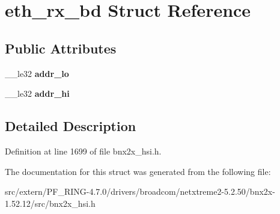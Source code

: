 \hypertarget{structeth__rx__bd}{
\section{eth\_\-rx\_\-bd Struct Reference}
\label{structeth__rx__bd}
}
\subsection*{Public Attributes}
\begin{DoxyCompactItemize}
\item 
\hypertarget{structeth__rx__bd_a3e3180c69bdf1c9360beece3576397b0}{
\_\-\_\-le32 {\bfseries addr\_\-lo}}
\label{structeth__rx__bd_a3e3180c69bdf1c9360beece3576397b0}

\item 
\hypertarget{structeth__rx__bd_a1c6659f690a0cae4525b2527d08d4e4b}{
\_\-\_\-le32 {\bfseries addr\_\-hi}}
\label{structeth__rx__bd_a1c6659f690a0cae4525b2527d08d4e4b}

\end{DoxyCompactItemize}


\subsection{Detailed Description}


Definition at line 1699 of file bnx2x\_\-hsi.h.



The documentation for this struct was generated from the following file:\begin{DoxyCompactItemize}
\item 
src/extern/PF\_\-RING-\/4.7.0/drivers/broadcom/netxtreme2-\/5.2.50/bnx2x-\/1.52.12/src/bnx2x\_\-hsi.h\end{DoxyCompactItemize}
